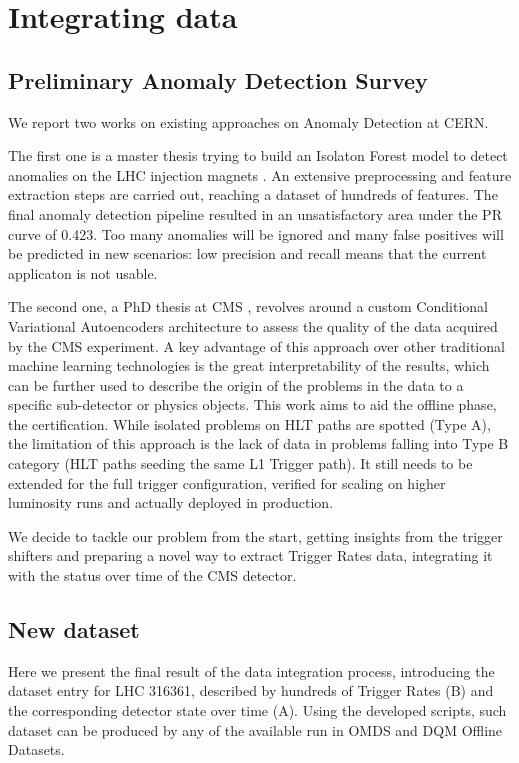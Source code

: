 \chapter{Integrating data}
\label{dataset}

\section{Preliminary Anomaly Detection Survey}

We report two works on existing approaches on Anomaly Detection at CERN. 

The first one is a master thesis trying to build an Isolaton Forest model to detect anomalies on the LHC injection magnets \cite{Halilovic:2665985}. An extensive preprocessing and feature extraction steps are carried out, reaching a dataset of hundreds of features. 
The final anomaly detection pipeline resulted in an unsatisfactory area under the PR curve of 0.423. Too many anomalies will be ignored and many false positives will be predicted in new scenarios: low precision and recall means that the current applicaton is not usable.

The second one, a PhD thesis at CMS \cite{Pol:2020weg}, revolves around a custom Conditional Variational Autoencoders architecture to assess the quality of the data acquired by the CMS experiment. A key advantage of this approach over other traditional machine learning technologies is the great interpretability of the results, which can be further used to describe the origin of the problems in the data to a specific sub-detector or physics objects. This work aims to aid the offline phase, the certification. While isolated problems on HLT paths are spotted (Type A), the limitation of this approach is the lack of data in problems falling into Type B category (HLT paths seeding the same L1 Trigger path). It still needs to be extended for the full trigger configuration, verified for scaling on higher luminosity runs and actually deployed in production.

We decide to tackle our problem from the start, getting insights from the trigger shifters and preparing a novel way to extract Trigger Rates data, integrating it with the status over time of the CMS detector.

\section{New dataset}

Here we present the final result of the data integration process, introducing the dataset entry for LHC 316361, described by hundreds of Trigger Rates (B) and the corresponding detector state over time (A). Using the developed scripts, such dataset can be produced by any of the available run in OMDS and DQM Offline Datasets.


